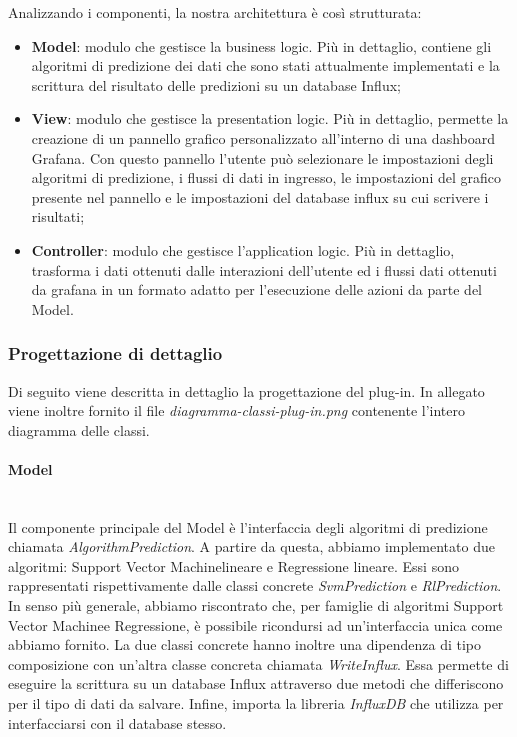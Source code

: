 Analizzando i componenti, la nostra architettura è così strutturata: 
\begin{itemize}
	\item \textbf{Model}: modulo che gestisce la business logic\glo. Più in dettaglio, contiene gli algoritmi di predizione dei dati che sono stati attualmente implementati e la scrittura del risultato delle predizioni su un database Influx;
	\item \textbf{View}: modulo che gestisce la presentation logic. Più in dettaglio, permette la creazione di un pannello grafico personalizzato all'interno di una dashboard Grafana\glo. Con questo pannello l'utente può selezionare le impostazioni degli algoritmi di predizione, i flussi di dati in ingresso, le impostazioni del grafico presente nel pannello e le impostazioni del database influx su cui scrivere i risultati;
	\item \textbf{Controller}: modulo che gestisce l'application logic. Più in dettaglio, trasforma i dati ottenuti dalle interazioni dell'utente ed i flussi dati ottenuti da grafana in un formato adatto per l'esecuzione delle azioni da parte del Model.
\end{itemize}
\subsubsection{Progettazione di dettaglio}
Di seguito viene descritta in dettaglio la progettazione del plug-in. In allegato viene inoltre fornito il file \textit{diagramma-classi-plug-in.png} contenente l'intero diagramma delle classi.
\paragraph{Model} \mbox{}\\ [1mm]
Il componente principale del Model è l'interfaccia degli algoritmi di predizione chiamata \textit{AlgorithmPrediction}. A partire da questa, abbiamo implementato due algoritmi: Support Vector Machine\glosp lineare e Regressione lineare\glo. Essi sono rappresentati rispettivamente dalle classi concrete \textit{SvmPrediction} e \textit{RlPrediction}. In senso più generale, abbiamo riscontrato che, per famiglie di algoritmi Support Vector Machine\glosp e Regressione\glo, è possibile ricondursi ad un'interfaccia unica come abbiamo fornito.
La due classi concrete hanno inoltre una dipendenza di tipo composizione con un'altra classe concreta chiamata \textit{WriteInflux}. Essa permette di eseguire la scrittura su un database Influx attraverso due metodi che differiscono per il tipo di dati da salvare. Infine, importa la libreria \textit{InfluxDB} che utilizza per interfacciarsi con il database stesso.
